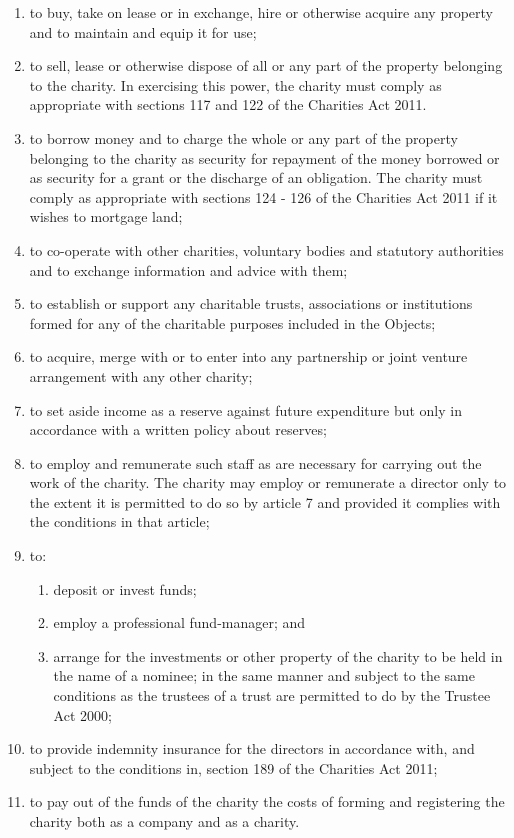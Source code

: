 \documentclass{article}
\begin{document}
\begin{enumerate}[label=\arabic*]
\begin{enumerate}[label=(\arabic*)]
        \item to buy, take on lease or in exchange, hire or otherwise acquire
        any property and to maintain and equip it for use;
        \item to sell, lease or otherwise dispose of all or any part of the
        property belonging to the charity. In exercising this power, the
        charity must comply as appropriate with sections 117 and 122
        of the Charities Act 2011.
        \item to borrow money and to charge the whole or any part of the
        property belonging to the charity as security for repayment of
        the money borrowed or as security for a grant or the discharge
        of an obligation. The charity must comply as appropriate with
        sections 124 - 126 of the Charities Act 2011 if it wishes to
        mortgage land;
        \item to co-operate with other charities, voluntary bodies and
        statutory authorities and to exchange information and advice
        with them;
        \item to establish or support any charitable trusts, associations or
        institutions formed for any of the charitable purposes included
        in the Objects;
        \item to acquire, merge with or to enter into any partnership or joint
        venture arrangement with any other charity;
        \item to set aside income as a reserve against future expenditure but
        only in accordance with a written policy about reserves;
        \item to employ and remunerate such staff as are necessary for
        carrying out the work of the charity. The charity may employ
        or remunerate a director only to the extent it is permitted to do
        so by article 7 and provided it complies with the conditions in
        that article;
        \item to:
        \begin{enumerate}[label=(\alph*)]
            \item deposit or invest funds;
            \item employ a professional fund-manager; and
            \item arrange for the investments or other property of the
            charity to be held in the name of a nominee;
            in the same manner and subject to the same conditions as the
            trustees of a trust are permitted to do by the Trustee Act 2000;
        \end{enumerate}
        \item to provide indemnity insurance for the directors in accordance
        with, and subject to the conditions in, section 189 of the
        Charities Act 2011;
        \item to pay out of the funds of the charity the costs of forming and
        registering the charity both as a company and as a charity.
    \end{enumerate}
    

\end{enumerate}
\end{document}
